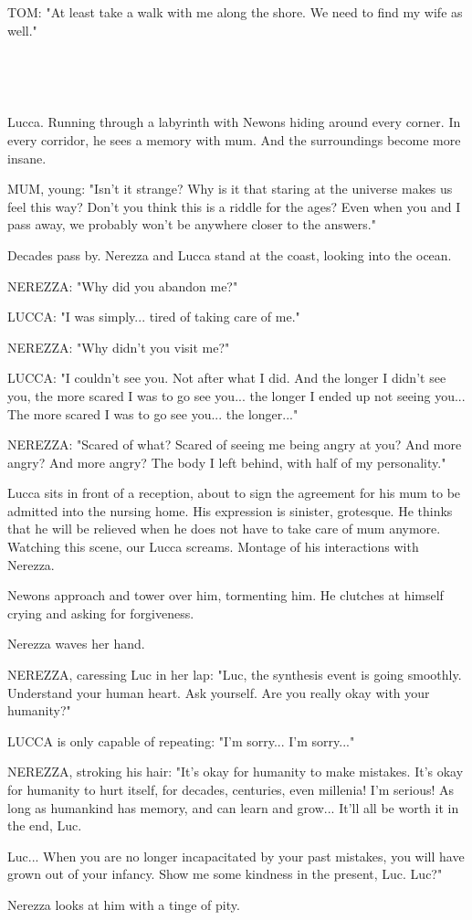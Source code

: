 \documentclass[11pt]{article}
\begin{document}
TOM: "At least take a walk with me along the shore.
We need to find my wife as well."

\ 

\ 

Lucca.
Running through a labyrinth with Newons hiding around every corner.
In every corridor, he sees a memory with mum.
And the surroundings become more insane.

MUM, young: "Isn't it strange?
Why is it that staring at the universe makes us feel this way?
Don't you think this is a riddle for the ages?
Even when you and I pass away, we probably won't be anywhere closer to the answers."

Decades pass by.
Nerezza and Lucca stand at the coast, looking into the ocean.

NEREZZA: "Why did you abandon me?"

LUCCA: "I was simply... tired of taking care of me."

NEREZZA: "Why didn't you visit me?"

LUCCA: "I couldn't see you. Not after what I did.
And the longer I didn't see you, the more scared I was to go see you...
the longer I ended up not seeing you...
The more scared I was to go see you...
the longer..."

NEREZZA: "Scared of what?
Scared of seeing me being angry at you?
And more angry?
And more angry?
The body I left behind, with half of my personality."

Lucca sits in front of a reception, about to sign the agreement for his mum to be admitted into the nursing home.
His expression is sinister, grotesque.
He thinks that he will be relieved when he does not have to take care of mum anymore.
Watching this scene, our Lucca screams. 
Montage of his interactions with Nerezza.

Newons approach and tower over him, tormenting him.
He clutches at himself crying and asking for forgiveness.

Nerezza waves her hand.

NEREZZA, caressing Luc in her lap: "Luc, the synthesis event is going smoothly.
Understand your human heart.
Ask yourself.
Are you really okay with your humanity?"

LUCCA is only capable of repeating: "I'm sorry... 
I'm sorry..."

NEREZZA, stroking his hair: "It's okay for humanity to make mistakes.
It's okay for humanity to hurt itself, for decades, centuries, even millenia!
I'm serious!
As long as humankind has memory, and can learn and grow...
It'll all be worth it in the end, Luc.

Luc... 
When you are no longer incapacitated by your past mistakes, you will have grown out of your infancy.
Show me some kindness in the present, Luc.
Luc?"

Nerezza looks at him with a tinge of pity.
\end{document}
